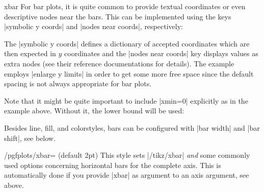 {\begin{plottype}{xbar}
	For bar plots, it is quite common to provide textual coordinates or even descriptive nodes near the bars.
	This can be implemented using the keys |symbolic y coords| and |nodes near coords|, respectively:
\begin{codeexample}[]
\end{codeexample}
	The |symbolic y coords| defines a dictionary of accepted coordinates which are then expected in $y$ coordinates and the |nodes near coords| key displays values as extra nodes (see their reference documentations for details). The example employs |enlarge y limits| in order to get some more free space since the default spacing is not always appropriate for bar plots.

	Note that it might be quite important to include |xmin=0| explicitly as in the example above. Without it, the lower bound will be used:
\begin{codeexample}[]
\end{codeexample}

	Besides line, fill, and colorstyles, bars can be configured with |bar width| and |bar shift|, see below.
\end{plottype}

\begin{stylekey}{/pgfplots/xbar= (default 2pt)}
	This style sets |/tikz/xbar| \emph{and} some commonly used options concerning horizontal bars for the complete axis. This is automatically done if you provide |xbar| as argument to an axis argument, see above.


\end{stylekey}}
